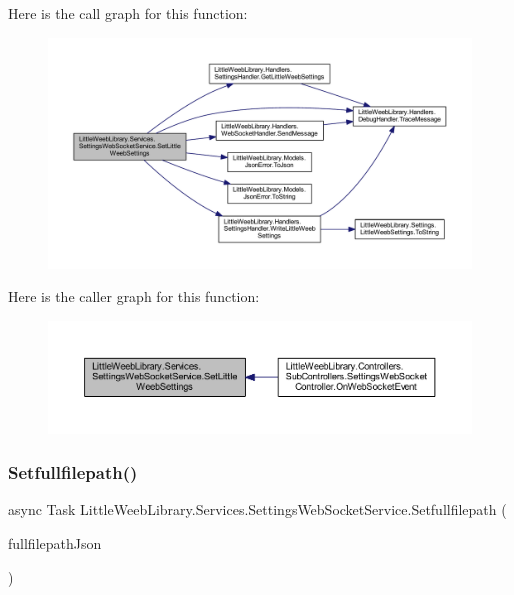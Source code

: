 Here is the call graph for this function\+:\nopagebreak
\begin{figure}[H]
\begin{center}
\leavevmode
\includegraphics[width=350pt]{class_little_weeb_library_1_1_services_1_1_settings_web_socket_service_aa53e9a1723c0b2d607d2aa9db1991c3c_cgraph}
\end{center}
\end{figure}
Here is the caller graph for this function\+:\nopagebreak
\begin{figure}[H]
\begin{center}
\leavevmode
\includegraphics[width=350pt]{class_little_weeb_library_1_1_services_1_1_settings_web_socket_service_aa53e9a1723c0b2d607d2aa9db1991c3c_icgraph}
\end{center}
\end{figure}
\mbox{\label{class_little_weeb_library_1_1_services_1_1_settings_web_socket_service_aef49a5d18d17b206d2807bba6c28f793}} 
\subsubsection{\texorpdfstring{Setfullfilepath()}{Setfullfilepath()}}
{\footnotesize\ttfamily async Task Little\+Weeb\+Library.\+Services.\+Settings\+Web\+Socket\+Service.\+Setfullfilepath (\begin{DoxyParamCaption}\item[{J\+Object}]{fullfilepath\+Json }\end{DoxyParamCaption})}




